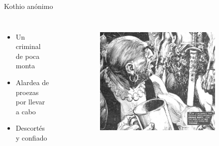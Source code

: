 \begin{frame}{Kothio anónimo}
\begin{columns}
\begin{itemize}
 \item Un criminal de poca monta
 \item Alardea de proezas por llevar a cabo
 \item Descortés y confiado
\end{itemize}
\begin{figure}[htp]
 \centering
 \begin{subfigure}[b]{0.3\textwidth}
   \includegraphics[width=\textwidth]{img/khotio/TSSC}
 \end{subfigure}
~
 \begin{subfigure}[b]{0.25\textwidth}

\end{subfigure}
\end{figure}
\end{columns}
\end{frame}
